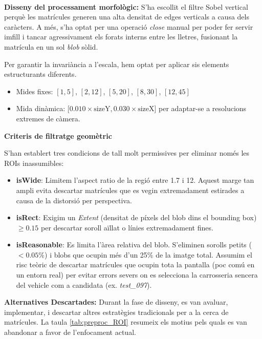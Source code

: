\

\textbf{Disseny del processament morfològic:}
S'ha escollit el filtre Sobel vertical perquè les matrícules generen una alta densitat de edges verticals a causa dels caràcters. A més, s'ha optat per una operació \textit{close} manual per poder fer servir imfill i tancar agressivament els forats interns entre les lletres, fusionant la matrícula en un sol \textit{blob} sòlid.

Per garantir la invariància a l'escala, hem optat per aplicar sis elements estructurants diferents.
\begin{itemize}
    \item Mides fixes: $[1, 5]$, $[2, 12]$, $[5, 20]$, $[8, 30]$, $[12, 45]$
    \item Mida dinàmica: [$0.010 \times \text{sizeY}, 0.030 \times \text{sizeX}$] per adaptar-se a resolucions extremes de càmera.
\end{itemize}

\textbf{Criteris de filtratge geomètric}

S'han establert tres condicions de tall molt permissives per eliminar només les ROIs inassumibles:

\begin{itemize}
    \item \textbf{isWide}: Limitem l'aspect ratio de la regió entre 1.7 i 12. Aquest marge tan ampli evita descartar matrícules que es vegin extremadament estirades a causa de la distorsió per perspectiva.

    \item \textbf{isRect}: Exigim un \textit{Extent} (densitat de píxels del blob dins el bounding box) $\geq 0.15$ per descartar soroll aïllat o línies extremadament fines.

    \item \textbf{isReasonable}: Es limita l'àrea relativa del blob. S'eliminen sorolls petits ($< 0.05\%$) i blobs que ocupin més d'un 25\% de la imatge total. Assumim el risc teòric de descartar matrícules que ocupin tota la pantalla (poc comú en un entorn real) per evitar errors severs on es selecciona la carrosseria sencera del vehicle com a candidata (ex. \textit{test\_097}).
\end{itemize}

\textbf{Alternatives Descartades:}
Durant la fase de disseny, es van avaluar, implementar, i descartar altres estratègies tradicionals per a la cerca de matrícules. La taula \ref{tab:preproc_ROI} resumeix els motius pels quals es van abandonar a favor de l'enfocament actual.


